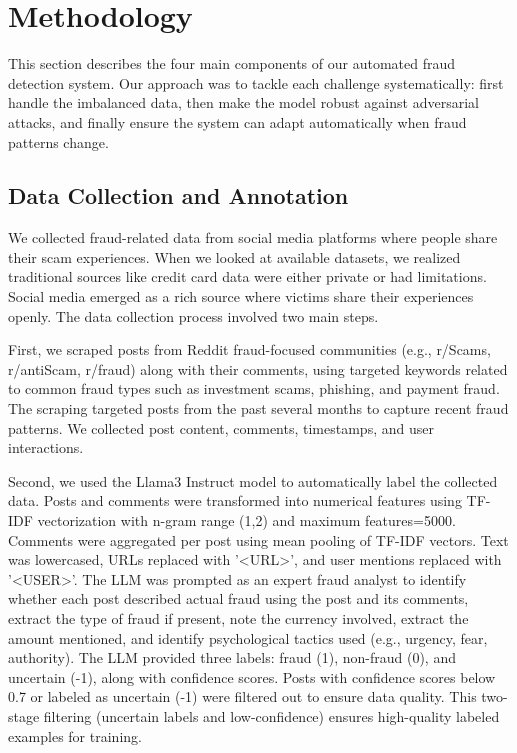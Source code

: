\documentclass{svproc}
\begin{document}
\section{Methodology}\label{sec:methodology}
This section describes the four main components of our automated fraud detection system. Our approach was to tackle each challenge systematically: first handle the imbalanced data, then make the model robust against adversarial attacks, and finally ensure the system can adapt automatically when fraud patterns change.

\subsection{Data Collection and Annotation}
We collected fraud-related data from social media platforms where people share their scam experiences. When we looked at available datasets, we realized traditional sources like credit card data were either private or had limitations. Social media emerged as a rich source where victims share their experiences openly. The data collection process involved two main steps.

First, we scraped posts from Reddit fraud-focused communities (e.g., r/Scams, r/antiScam, r/fraud) along with their comments, using targeted keywords related to common fraud types such as investment scams, phishing, and payment fraud. The scraping targeted posts from the past several months to capture recent fraud patterns. We collected post content, comments, timestamps, and user interactions.

Second, we used the Llama3 Instruct model to automatically label the collected data. Posts and comments were transformed into numerical features using TF-IDF vectorization with n-gram range (1,2) and maximum features=5000. Comments were aggregated per post using mean pooling of TF-IDF vectors. Text was lowercased, URLs replaced with '<URL>', and user mentions replaced with '<USER>'. The LLM was prompted as an expert fraud analyst to identify whether each post described actual fraud using the post and its comments, extract the type of fraud if present, note the currency involved, extract the amount mentioned, and identify psychological tactics used (e.g., urgency, fear, authority). The LLM provided three labels: fraud (1), non-fraud (0), and uncertain (-1), along with confidence scores. Posts with confidence scores below 0.7 or labeled as uncertain (-1) were filtered out to ensure data quality. This two-stage filtering (uncertain labels and low-confidence) ensures high-quality labeled examples for training.
\end{document}
